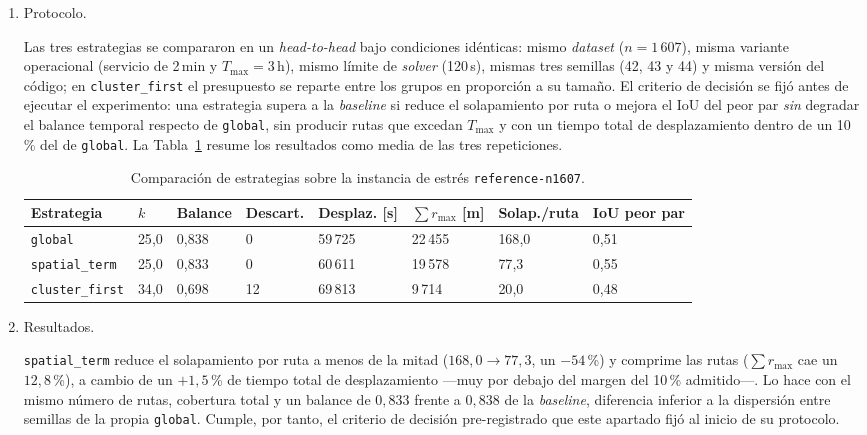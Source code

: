 \begin{enumerate}
\item Protocolo.

Las tres estrategias se compararon en un \textit{head-to-head} bajo condiciones idénticas: mismo
\textit{dataset} ($n = 1\,607$), misma variante operacional (servicio de 2\,min y
$T_{\max} = 3$\,h), mismo límite de \textit{solver} (120\,s), mismas tres semillas (42, 43 y 44) y
misma versión del código; en \texttt{cluster\_first} el presupuesto se reparte entre los grupos en
proporción a su tamaño. El criterio de decisión se fijó antes de ejecutar el experimento: una
estrategia supera a la \textit{baseline} si reduce el solapamiento por ruta o mejora el IoU del
peor par \textit{sin} degradar el balance temporal respecto de \texttt{global}, sin producir rutas
que excedan $T_{\max}$ y con un tiempo total de desplazamiento dentro de un 10\,\% del de
\texttt{global}. La Tabla~\ref{tab:estrategias} resume los resultados como media de las tres
repeticiones.

\begin{table}[H]
  \centering
  \caption{Comparación de estrategias sobre la instancia de estrés \texttt{reference-n1607}.}
  \label{tab:estrategias}
  \small
  \begin{tabularx}{\textwidth}{lXXXXXXX}
    \toprule
    Estrategia &
      $k$ &
      Balance &
      Descart. &
      Des\-plaz. [s] &
      $\sum r_{\max}$ [m] &
      Solap.\slash ruta &
      IoU peor par \\
    \midrule
    \texttt{global}        &
      25{,}0 &
      0{,}838 &
      0  &
      59\,725 &
      22\,455 &
      168{,}0 &
      0{,}51 \\
    \texttt{spatial\_term} &
      25{,}0 &
      0{,}833 &
      0  &
      60\,611 &
      19\,578 &
      77{,}3  &
      0{,}55 \\
    \texttt{cluster\_first}& 34{,}0 &
      0{,}698 &
      12 &
      69\,813 &
      9\,714  &
      20{,}0  &
      0{,}48 \\
    \bottomrule
  \end{tabularx}
\end{table}

\item Resultados.

\texttt{spatial\_term} reduce el solapamiento por ruta a menos de la mitad ($168{,}0 \rightarrow
77{,}3$, un $-54$\,\%) y comprime las rutas ($\sum r_{\max}$ cae un $12{,}8$\,\%), a cambio de un
$+1{,}5$\,\% de tiempo total de desplazamiento ---muy por debajo del margen del 10\,\% admitido---.
Lo hace con el mismo número de rutas, cobertura total y un balance de $0{,}833$ frente a $0{,}838$
de la \textit{baseline}, diferencia inferior a la dispersión entre semillas de la propia
\texttt{global}. Cumple, por tanto, el criterio de decisión pre-registrado que este apartado fijó
al inicio de su protocolo.


\end{enumerate}

